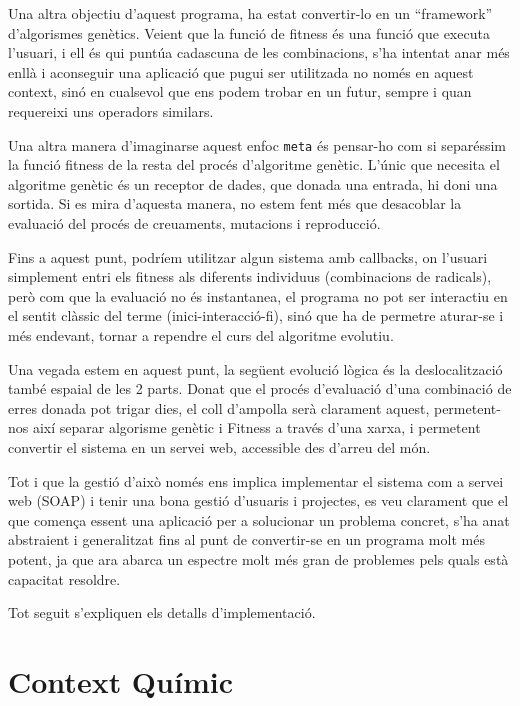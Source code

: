 \documentclass[titlepage,a4paper,12pt]{book}
\begin{document}
	Una altra objectiu d'aquest programa, ha estat convertir-lo en un
	``framework'' d'algorismes genètics.  Veient que la funció de fitness és una
	funció que executa l'usuari, i ell és qui puntúa cadascuna de les
	combinacions, s'ha intentat anar més enllà i aconseguir una aplicació que
	pugui ser utilitzada no només en aquest context, sinó en cualsevol que ens
	podem trobar en un futur, sempre i quan requereixi uns operadors similars.

	Una altra manera d'imaginarse aquest enfoc \texttt{meta} és pensar-ho com si
	separéssim la funció fitness de la resta del procés d'algoritme genètic.
	L'únic que necesita el algoritme genètic és un receptor de dades, que
	donada una entrada, hi doni una sortida.  Si es mira d'aquesta manera, no
	estem fent més que desacoblar la evaluació del procés de creuaments,
	mutacions i reproducció.

	Fins a aquest punt, podríem utilitzar algun sistema amb callbacks, on
	l'usuari simplement entri els fitness als diferents individuus (combinacions
	de radicals), però com que la evaluació no és instantanea, el programa no
	pot ser interactiu en el sentit clàssic del terme (inici-interacció-fi),
	sinó que ha de permetre aturar-se i més endevant, tornar a rependre el curs
	del algoritme evolutiu. 

	Una vegada estem en aquest punt, la següent evolució lògica és la
	deslocalització també espaial de les 2 parts.  Donat que el procés
	d'evaluació d'una combinació de erres donada pot trigar dies, el coll
	d'ampolla serà clarament aquest, permetent-nos així separar algorisme
	genètic i Fitness a través d'una xarxa, i permetent convertir el sistema en
	un servei web, accessible des d'arreu del món.

	Tot i que la gestió d'això només ens implica implementar el sistema com a
	servei web (SOAP) i tenir una bona gestió d'usuaris i projectes, es veu
	clarament que el que comença essent una aplicació per a solucionar un
	problema concret, s'ha anat abstraient i generalitzat fins al punt de
	convertir-se en un programa molt més potent, ja que ara abarca un espectre
	molt més gran de problemes pels quals està capacitat resoldre.

	Tot seguit s'expliquen els detalls d'implementació.


\section{Context Químic} %
	\label{sec:Context Quimic}
\end{document}
